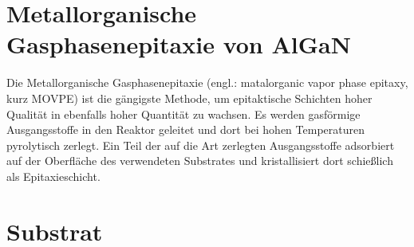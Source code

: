 \thispagestyle{fancy}


\section{Metallorganische Gasphasenepitaxie von AlGaN}

Die Metallorganische Gasphasenepitaxie (engl.: matalorganic vapor phase epitaxy, kurz MOVPE) ist die gängigste Methode, um epitaktische Schichten hoher Qualität in ebenfalls hoher Quantität zu wachsen. Es werden gasförmige Ausgangsstoffe in den Reaktor geleitet und dort bei hohen Temperaturen pyrolytisch zerlegt. Ein Teil der auf die Art zerlegten Ausgangsstoffe adsorbiert auf der Oberfläche des verwendeten Substrates und kristallisiert dort schießlich als Epitaxieschicht. 

\section{Substrat}

